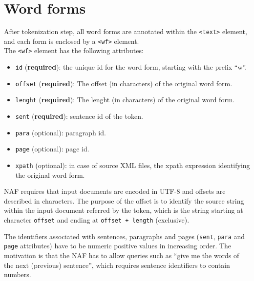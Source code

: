 
\section{Word forms}
\label{sec:word-forms}

After tokenization step, all word forms are annotated within the
\texttt{<text>} element, and each form is enclosed by a \texttt{<wf>}
element.\\

The \texttt{<wf>} element has the following attributes:
\begin{itemize}
\item \texttt{id} (\textbf{required}): the unique id for the word form,
  starting with the prefix ``w''.
\item \texttt{offset} (\textbf{required}): The offset (in characters) of the
  original word form.
\item \texttt{lenght} (\textbf{required}): The lenght (in characters) of the
  original word form.
\item \texttt{sent} (\textbf{required}): sentence id of the token.
\item \texttt{para} (optional): paragraph id.
\item \texttt{page} (optional): page id.
\item \texttt{xpath} (optional): in case of source XML files, the xpath
  expression identifying the original word form.
\end{itemize}

NAF requires that input documents are encoded in UTF-8 and offsets are
described in characters. The purpose of the offset is to identify the source
string within the input document referred by the token, which is the string
starting at character \texttt{offset} and ending at \texttt{offset + length}
(exclusive).

The identifiers associated with sentences, paragraphs and pages
(\texttt{sent}, \texttt{para} and \texttt{page} attributes) have to be
numeric positive values in increasing order. The motivation is that the NAF
has to allow queries such as ``give me the words of the next (previous)
sentence'', which requires sentence identifiers to contain numbers.

